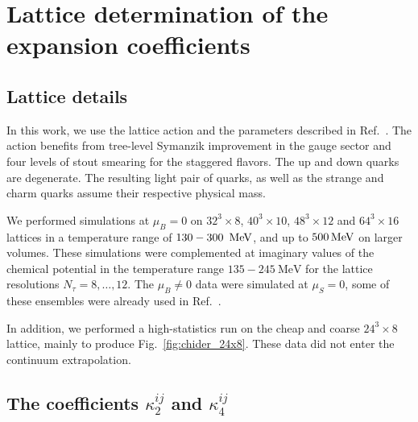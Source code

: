 \documentclass[aps,prd,twocolumn,superscriptaddress]{revtex4-2}
\newcommand{\MeV}{\, {\rm MeV}}
\begin{document}
\section{Lattice determination of the expansion coefficients \label{sec:lattice}}

\subsection{Lattice details}

In this work, we use the lattice action and the parameters described in
Ref.~\cite{Bellwied:2015lba}. The action benefits from tree-level
Symanzik improvement in the gauge sector and four levels of stout smearing
for the staggered flavors. The up and down quarks are degenerate. The
resulting light pair of quarks, as well as the strange and charm quarks assume
their respective physical mass.

We performed simulations at $\mu_B=0$ on $32^3\times 8$, $40^3\times 10$, 
$48^3\times12$ and $64^3\times 16$ lattices in a temperature range of 
$130-300~\MeV$, and up to $500 \MeV$ on larger volumes. These simulations 
were complemented
at imaginary values of the chemical potential in the temperature range 
$135-245~\mathrm{MeV}$ for the lattice resolutions $N_\tau=8,\dots,12$.
The $\mu_B\ne0$ data were simulated at $\mu_S=0$, some of these ensembles were
already used in Ref.~\cite{Borsanyi:2018grb}.

In addition, we performed a high-statistics run on the cheap and coarse
$24^3\times 8$ lattice, mainly to produce Fig.~\ref{fig:chider_24x8}.
These data did not enter the continuum extrapolation.

\subsection{The coefficients $\kappa_2^{ij}$ and $\kappa_4^{ij}$}
\end{document}
